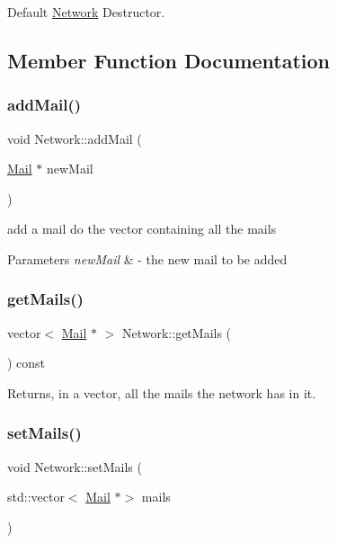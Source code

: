 Default \hyperlink{classNetwork}{Network} Destructor. 



\subsection{Member Function Documentation}
\mbox{\label{classNetwork_a848afdda14081f142404050833050d4b}} 
\subsubsection{\texorpdfstring{add\+Mail()}{addMail()}}
{\footnotesize\ttfamily void Network\+::add\+Mail (\begin{DoxyParamCaption}\item[{\hyperlink{classMail}{Mail} $\ast$}]{new\+Mail }\end{DoxyParamCaption})}



add a mail do the vector containing all the mails 


\begin{DoxyParams}{Parameters}
{\em new\+Mail} & -\/ the new mail to be added \\
\hline
\end{DoxyParams}
\mbox{\label{classNetwork_acd375ea0a8fb7558f15a432ce6354d93}} 
\subsubsection{\texorpdfstring{get\+Mails()}{getMails()}}
{\footnotesize\ttfamily vector$<$ \hyperlink{classMail}{Mail} $\ast$ $>$ Network\+::get\+Mails (\begin{DoxyParamCaption}{ }\end{DoxyParamCaption}) const}



Returns, in a vector, all the mails the network has in it. 

\mbox{\label{classNetwork_a2dfe751f83ea0ed37835baf23770d1b6}} 
\subsubsection{\texorpdfstring{set\+Mails()}{setMails()}}
{\footnotesize\ttfamily void Network\+::set\+Mails (\begin{DoxyParamCaption}\item[{std\+::vector$<$ \hyperlink{classMail}{Mail} $\ast$$>$}]{mails }\end{DoxyParamCaption})}



